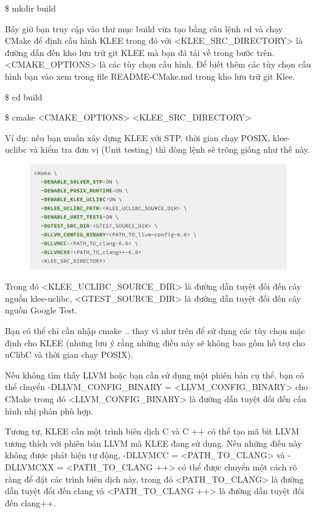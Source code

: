 \documentclass[12pt,a4paper]{report}
\begin{document}
\begin{framed}
\$ mkdir build
\end{framed}

Bây giờ bạn truy cập vào thư mục build vừa tạo bằng câu lệnh cd và chạy CMake để định cấu hình KLEE trong đó với <KLEE\_SRC\_DIRECTORY> là đường dẫn đến kho lưu trữ git KLEE mà bạn đã tải về trong bước trên. <CMAKE\_OPTIONS> là các tùy chọn cấu hình. Để biết thêm các tùy chọn cấu hình bạn vào xem trong file README-CMake.md trong kho lưu trữ git Klee.

\begin{framed}
\$ cd build

\$ cmake <CMAKE\_OPTIONS> <KLEE\_SRC\_DIRECTORY>
\end{framed}

Ví dụ: nếu bạn muốn xây dựng KLEE với STP, thời gian chạy POSIX, klee-uclibc và kiểm tra đơn vị (Unit testing) thì dòng lệnh sẽ trông giống như thế này. \newpage

\begin{figure}[ht]
\begin{center}
\includegraphics[scale=.3]{hinhanh/cmakeklee.png}
\end{center}
\end{figure}

Trong đó <KLEE\_UCLIBC\_SOURCE\_DIR> là đường dẫn tuyệt đối đến cây nguồn klee-uclibc, <GTEST\_SOURCE\_DIR> là đường dẫn tuyệt đối đến cây nguồn Google Test.

Bạn có thể chỉ cần nhập cmake .. thay vì như trên để sử dụng các tùy chọn mặc định cho KLEE (nhưng lưu ý rằng những điều này sẽ không bao gồm hỗ trợ cho uClibC và thời gian chạy POSIX).

Nếu không tìm thấy LLVM hoặc bạn cần sử dụng một phiên bản cụ thể, bạn có thể chuyển -DLLVM\_CONFIG\_BINARY = <LLVM\_CONFIG\_BINARY> cho CMake trong đó <LLVM\_CONFIG\_BINARY> là đường dẫn tuyệt đối đến cấu hình nhị phân phù hợp.

Tương tự, KLEE cần một trình biên dịch C và C ++ có thể tạo mã bit LLVM tương thích với phiên bản LLVM mà KLEE đang sử dụng. Nếu những điều này không được phát hiện tự động, -DLLVMCC = <PATH\_TO\_CLANG> và -DLLVMCXX = <PATH\_TO\_CLANG ++> có thể được chuyển một cách rõ ràng để đặt các trình biên dịch này, trong đó <PATH\_TO\_CLANG> là đường dẫn tuyệt đối đến clang và <PATH\_TO\_CLANG ++> là đường dẫn tuyệt đối đến clang++.
\end{document}
